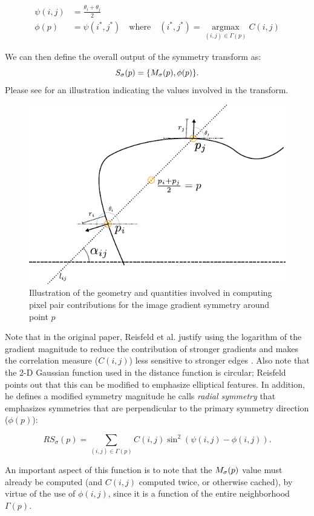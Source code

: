 \begin{align}
\psi(i,j) &= \frac{\theta_i + \theta_j}{2} \\
\phi(p)   &= \psi(i^*,j^*)\quad\mathrm{where}\quad(i^*,j^*) = \operatorname*{argmax}_{(i,j) \in \Gamma(p)} C(i,j)
\end{align} 

We can then define the overall output of the symmetry transform as:
\[S_\sigma(p) = \{M_\sigma(p), \phi(p)\}.\] Please see  for an illustration indicating the values involved in the transform.

\Needspace{0.3\textheight}
\begin{figure}[ht]
\centering
\includegraphics[width=0.6\linewidth]{figures/pixel_contributions.pdf}
\caption{\label{fig:pixel-contr}
Illustration of the geometry and quantities involved in computing pixel pair contributions for the image gradient symmetry around point \(p\)}
\end{figure}

Note that in the original paper, Reisfeld et al. justify using the logarithm of the gradient magnitude to reduce the contribution of stronger gradients and makes the correlation measure (\(C(i,j)\)) less sensitive to stronger edges \cite{reisfeld_context_1995}. Also note that the 2-D Gaussian function used in the distance function is circular; Reisfeld points out that this can be modified to emphasize elliptical features. In addition, he defines a modified symmetry magnitude he calls \emph{radial symmetry} that emphasizes symmetries that are perpendicular to the primary symmetry direction (\ie \(\phi(p)\)):

\[ RS_\sigma(p) = \sum_{(i,j) \in \Gamma(p)} C(i,j) \sin^2 \left(\psi(i,j) - \phi(i,j)\right). \] 

An important aspect of this function is to note that the \(M_\sigma(p)\) value must already be computed (and \(C(i,j)\) computed twice, or otherwise cached), by virtue of the use of \(\phi(i,j)\), since it is a function of the entire neighborhood \(\Gamma(p)\).

